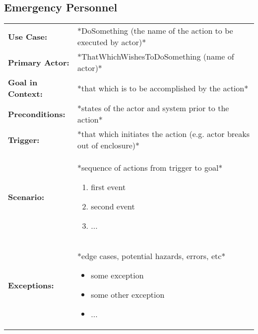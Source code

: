 \documentclass[12pt]{article}
\begin{document}
    \subsection{Emergency Personnel}
    \begin{table}[H]
    \begin{tabular}{lp{9.9cm}}
        \hline
        \textbf{Use Case:}                     & *DoSomething (the name of the action to be executed by actor)* \\

        \textbf{Primary Actor:}                & *ThatWhichWishesToDoSomething (name of actor)*\\

        \textbf{Goal in Context:}              & *that which is to be accomplished by the action* \\

        \textbf{Preconditions:}                & *states of the actor and system prior to the action* \\

        \textbf{Trigger:}                      & *that which initiates the action (e.g. actor breaks out of enclosure)*\\

        \textbf{Scenario:}                     & *sequence of actions from trigger to goal*
                                                 \begin{enumerate}
                                                     \item first event
                                                     \item second event
                                                     \item ...
                                                 \end{enumerate} \\

        \textbf{Exceptions:}                   & *edge cases, potential hazards, errors, etc*
                                                 \begin{itemize}
                                                     \item[] some exception
                                                     \item[] some other exception
                                                     \item[] ...
                                                 \end{itemize}\\


\end{tabular}
\end{table}
\end{document}
